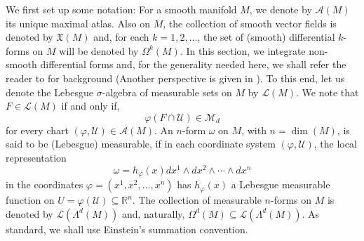 \documentclass[11pt, letter]{book}
\begin{document}
\noindent We first set up some notation: For a smooth manifold $M$, we denote by $\mathcal{A}(M)$ its unique maximal atlas. Also on $M$, the collection of smooth vector fields is denoted by $\mathfrak{X}(M)$ and, for each $k=1,2,\dots$, the set of (smooth) differential $k$-forms on $M$ will be denoted by $\Omega^k(M)$.  In this section, we integrate non-smooth differential forms and, for the generality needed here, we shall refer the reader to \cite{naber_topology_2011} for background (Another perspective is given in \cite{amann_analysis_2009}). To this end, let us denote the Lebesgue $\sigma$-algebra of measurable sets on $M$ by $\mathcal{L}(M)$. We note that $F\in\mathcal{L}(M)$ if and only if, \begin{equation*}
    \varphi(F\cap \mathcal{U})\in\mathcal{M}_d
\end{equation*}
for every chart $(\varphi,\mathcal{U})\in\mathcal{A}(M)$. An $n$-form $\omega$ on $M$, with $n=\dim(M)$, is said to be (Lebesgue) measurable, if in each coordinate system $(\varphi,\mathcal{U})$, the local representation
\begin{equation*}
    \omega=h_{\varphi}(x)dx^1\wedge dx^2\wedge \cdots\wedge dx^n
\end{equation*}
in the coordinates $\varphi=(x^1,x^2,\dots,x^n)$ has $h_{\varphi}(x)$ a Lebesgue measurable function on $U=\varphi(\mathcal{U})\subseteq\mathbb{R}^n$. The collection of measurable $n$-forms on $M$ is denoted by $\mathcal{L}(\Lambda^d(M))$ and, naturally, $\Omega^{d}(M)\subseteq \mathcal{L}(\Lambda^d(M))$. As standard, we shall use Einstein's summation convention.\\
\end{document}
